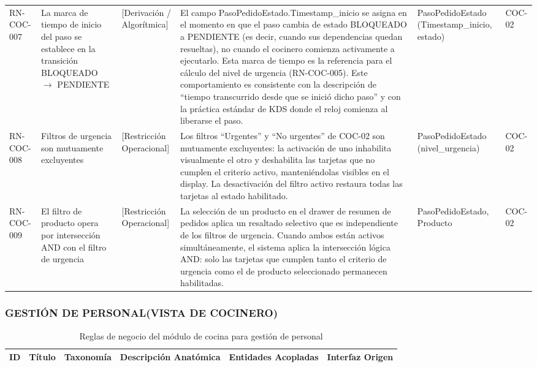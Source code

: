 \begin{landscape}
\begin{longtable}[c]{l p{2.1cm} p{2.1cm} p{8cm} p{4cm} p{3cm}}
RN-COC-007 & La marca de tiempo de inicio del paso se establece en la transición BLOQUEADO $\rightarrow$ PENDIENTE & [Derivación / Algorítmica] & El campo PasoPedidoEstado.Timestamp\_inicio se asigna en el momento en que el paso cambia de estado BLOQUEADO a PENDIENTE (es decir, cuando sus dependencias quedan resueltas), no cuando el cocinero comienza activamente a ejecutarlo. Esta marca de tiempo es la referencia para el cálculo del nivel de urgencia (RN-COC-005). Este comportamiento es consistente con la descripción de ``tiempo transcurrido desde que se inició dicho paso'' y con la práctica estándar de KDS donde el reloj comienza al liberarse el paso. & PasoPedidoEstado (Timestamp\_inicio, estado) & COC-02 \\
\addlinespace
RN-COC-008 & Filtros de urgencia son mutuamente excluyentes & [Restricción Operacional] & Los filtros ``Urgentes'' y ``No urgentes'' de COC-02 son mutuamente excluyentes: la activación de uno inhabilita visualmente el otro y deshabilita las tarjetas que no cumplen el criterio activo, manteniéndolas visibles en el display. La desactivación del filtro activo restaura todas las tarjetas al estado habilitado. & PasoPedidoEstado (nivel\_urgencia) & COC-02 \\
\addlinespace
RN-COC-009 & El filtro de producto opera por intersección AND con el filtro de urgencia & [Restricción Operacional] & La selección de un producto en el drawer de resumen de pedidos aplica un resaltado selectivo que es independiente de los filtros de urgencia. Cuando ambos están activos simultáneamente, el sistema aplica la intersección lógica AND: solo las tarjetas que cumplen tanto el criterio de urgencia como el de producto seleccionado permanecen habilitadas. & PasoPedidoEstado, Producto & COC-02 \\
\end{longtable}
\endgroup

\subsubsection{GESTIÓN DE PERSONAL(VISTA DE COCINERO)}
\begingroup
\setlength{\LTleft}{\fill}
\setlength{\LTright}{\fill}

\begin{longtable}[c]{l p{2.1cm} p{2.1cm} p{8cm} p{4cm} p{3cm}}
\caption{Reglas de negocio del módulo de cocina para gestión de personal} \label{tab:reglas-negocio-cocina-gestion-personal}\\
\toprule
\textbf{ID} & \textbf{Título} & \textbf{Taxonomía} & \textbf{Descripción Anatómica} & \textbf{Entidades Acopladas} & \textbf{Interfaz Origen} \\
\midrule
\endfirsthead


\end{longtable}
\end{landscape}
